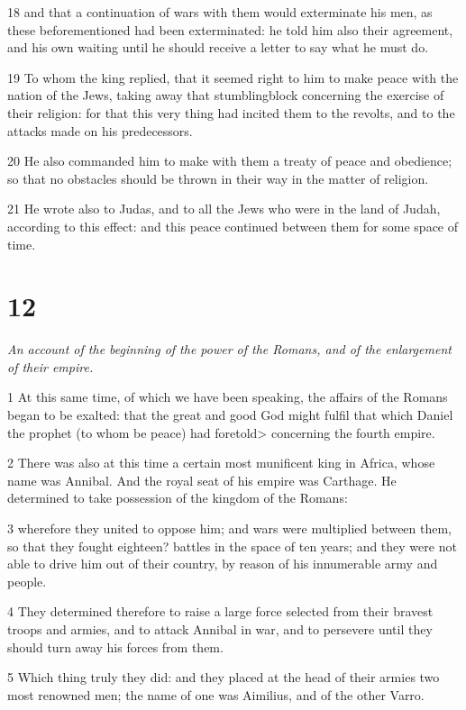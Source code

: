 18 and that a continuation of wars with them would exterminate his men, as these beforementioned had been exterminated: he told him also their agreement, and his own waiting until he should receive a letter to say what he must do. 

19 To whom the king replied, that it seemed right to him to make peace with the nation of the Jews, taking away that stumblingblock concerning the exercise of their religion: for that this very thing had incited them to the revolts, and to the attacks made on his predecessors. 

20 He also commanded him to make with them a treaty of peace and obedience; so that no obstacles should be thrown in their way in the matter of religion. 

21 He wrote also to Judas, and to all the Jews who were in the land of Judah, according to this effect: and this peace continued between them for some space of time. 


\chapter{12}

\par \textit{An account of the beginning of the power of the Romans, and of the enlargement of their empire.}

1 At this same time, of which we have been speaking, the affairs of the Romans began to be exalted: that the great and good God might fulfil that which Daniel the prophet (to whom be peace) had foretold> concerning the fourth empire. 

2 There was also at this time a certain most munificent king in Africa, whose name was Annibal. And the royal seat of his empire was Carthage. He determined to take possession of the kingdom of the Romans: 

3 wherefore they united to oppose him; and wars were multiplied between them, so that they fought eighteen? battles in the space of ten years; and they were not able to drive him out of their country, by reason of his innumerable army and people. 

4 They determined therefore to raise a large force selected from their bravest troops and armies, and to attack Annibal in war, and to persevere until they should turn away his forces from them. 

5 Which thing truly they did: and they placed at the head of their armies two most renowned men; the name of one was Aimilius, and of the other Varro. 

